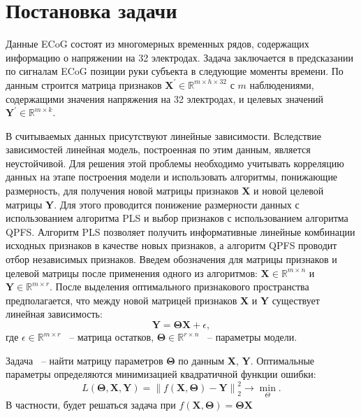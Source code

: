 \documentclass[12pt,twoside]{article}
\newcommand{\norm}[1]{\left\lVert#1\right\rVert}
\begin{document}
\section{Постановка задачи}

Данные ECoG состоят из многомерных временных рядов, содержащих информацию о напряжении на 32 электродах. Задача заключается в предсказании по сигналам ECoG позиции руки субъекта в следующие моменты времени. По данным строится матрица 
признаков $\textbf{X}^\prime \in \mathbb{R}^{m\times h \times 32}$ с $m$ наблюдениями, содержащими значения напряжения на 32 электродах, и целевых значений $\textbf{Y}^\prime \in \mathbb{R}^{m\times k}$. 

В считываемых данных присутствуют линейные зависимости. Вследствие зависимостей линейная модель, построенная по этим данным, является неустойчивой. Для решения этой проблемы необходимо учитывать корреляцию данных на этапе построения модели и использовать алгоритмы,
понижающие размерность, для получения новой матрицы признаков \textbf{X} и новой целевой
матрицы \textbf{Y}. Для этого проводится понижение размерности данных с использованием алгоритма PLS и выбор признаков с использованием алгоритма QPFS. Алгоритм PLS позволяет получить информативные линейные комбинации исходных признаков в качестве новых признаков, а алгоритм QPFS проводит отбор независимых признаков. Введем обозначения для матрицы признаков и целевой матрицы после применения одного из алгоритмов:  $\textbf{X} \in \mathbb{R}^{m\times n}$ и $\textbf{Y} \in \mathbb{R}^{m\times r}$. После выделения оптимального признакового пространства предполагается, что между новой матрицей признаков \textbf{X} и \textbf{Y} существует линейная зависимость: $$ \textbf{Y} = \boldsymbol{\Theta} \textbf{X} + \epsilon ,$$ где $\epsilon \in \mathbb{R}^{m\times r}$ ~-- матрица остатков, $ \boldsymbol{\Theta} \in \mathbb{R}^{r\times n}$ ~-- параметры модели. 

Задача ~-- найти матрицу параметров $ \boldsymbol{\Theta}$ по данным \textbf{X}, \textbf{Y}. Оптимальные параметры определяются минимизацией квадратичной функции ошибки:
$$ L( \boldsymbol{\Theta}, \textbf{X}, \textbf{Y}) = \norm{ f(\boldsymbol{X},\boldsymbol{\Theta})  - \textbf{Y}}^2_2 \to \min_{\Theta}. $$ В частности, будет решаться задача при $f(\boldsymbol{X},\boldsymbol{\Theta}) = \boldsymbol{\Theta} \textbf{X}$


{}

\end{document}
